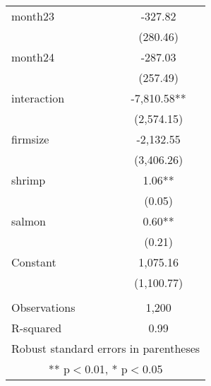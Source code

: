 \begin{tabular}{lc}
month23 & -327.82 \\
 & (280.46) \\
month24 & -287.03 \\
 & (257.49) \\
interaction & -7,810.58** \\
 & (2,574.15) \\
firmsize & -2,132.55 \\
 & (3,406.26) \\
shrimp & 1.06** \\
 & (0.05) \\
salmon & 0.60** \\
 & (0.21) \\
Constant & 1,075.16 \\
 & (1,100.77) \\
 &  \\
Observations & 1,200 \\
 R-squared & 0.99 \\ \hline
\multicolumn{2}{c}{ Robust standard errors in parentheses} \\
\multicolumn{2}{c}{ ** p$<$0.01, * p$<$0.05} \\
\end{tabular}
